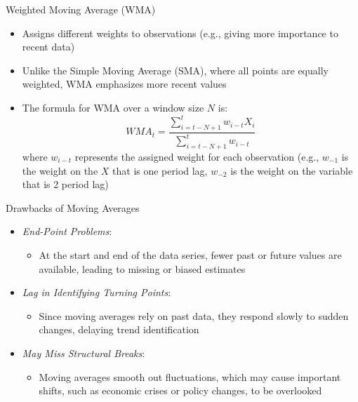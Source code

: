 \documentclass[aspectratio=1610]{beamer}
\begin{document}
\begin{frame}[wide]{Weighted Moving Average (WMA)}
	\begin{itemize}
		\item Assigns different weights to observations (e.g., giving more importance to recent data)
		\item Unlike the Simple Moving Average (SMA), where all points are equally weighted, WMA emphasizes more recent values
		\item The formula for WMA over a window size \( N \) is:
		\[
		WMA_t = \frac{\sum_{i=t-N+1}^{t} w_{i-t} X_i}{\sum_{i=t-N+1}^{t} w_{i-t}}
		\]
		where \( w_{i-t} \) represents the assigned weight for each observation (e.g., $w_{-1}$ is the weight on the $X$ that is one period lag, $w_{-2}$ is the weight on the variable that is 2 period lag)
	\end{itemize}
\end{frame}

\begin{frame}[wide]{Drawbacks of Moving Averages}
	\begin{itemize}
		\item \textit{End-Point Problems}: 
		\vspace{1mm}
		\begin{itemize}
			\item At the start and end of the data series, fewer past or future values are available, leading to missing or biased estimates
		\end{itemize}
		\item \textit{Lag in Identifying Turning Points}: 
		\vspace{1mm}
		\begin{itemize}
			\item Since moving averages rely on past data, they respond slowly to sudden changes, delaying trend identification
		\end{itemize}
		\item 
		\textit{May Miss Structural Breaks}: 
		\vspace{1mm}
		\begin{itemize}
			\item Moving averages smooth out fluctuations, which may cause important shifts, such as economic crises or policy changes, to be overlooked
		\end{itemize}
		
	\end{itemize}
\end{frame}
\end{document}
